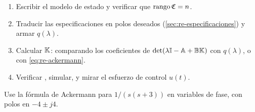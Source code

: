 \begin{receta}
\begin{enumerate}
  \item Escribir el modelo de estado y verificar que $\operatorname{rango}\mathfrak{C}=n$.
  \item Traducir las especificaciones en polos deseados (\cref{sec:re-especificaciones}) y armar $q(\lambda)$.
  \item Calcular $\mathbb{K}$: comparando los coeficientes de $\det(\lambda\mathbb{I}-\mathbb{A}+\mathbb{B}\mathbb{K})$ con $q(\lambda)$, o con \eqref{eq:re-ackermann}.
  \item Verificar , simular, y mirar el esfuerzo de control $u(t)$.
\end{enumerate}
\end{receta}

\begin{pausa}
Use la fórmula de Ackermann para $1/(s(s+3))$ en variables de fase, con polos en $-4\pm j4$.
\end{pausa}
